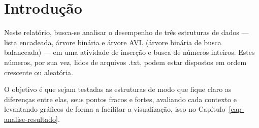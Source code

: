 \chapter*[Introdução]{Introdução}\label{cap-introducao}

Neste relatório, busca-se analisar o desempenho de três estruturas de dados --- lista encadeada, árvore binária e árvore AVL (árvore binária de busca balanceada) --- em uma atividade de inserção e busca de números inteiros. Estes números, por sua vez, lidos de arquivos .txt, podem estar dispostos em ordem crescente ou aleatória. 

O objetivo é que sejam testadas as estruturas de modo que fique claro as diferenças entre elas, seus pontos fracos e fortes, avaliando cada contexto e levantando gráficos de forma a facilitar a visualização, isso no Capítulo~\ref{cap-analise-resultado}.
